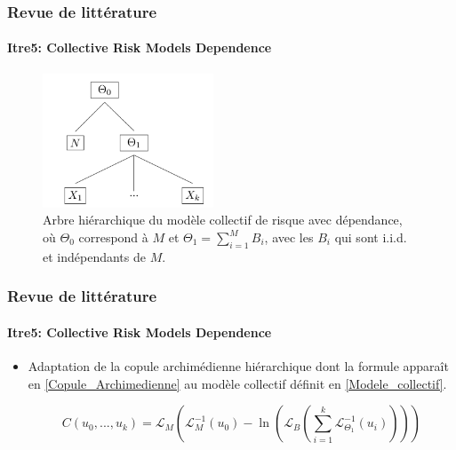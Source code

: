 \documentclass[11pt]{beamer}
\begin{document}
\begin{frame}
	\frametitle{Revue de littérature}
	\framesubtitle{Itre5: Collective Risk Models Dependence \cite{Itre5}}
	
	\begin{figure}[H]
		\centering
		\includegraphics[height=4cm]{Hierarchie}
		\renewcommand{\figurename}{Illustration}
		\caption{Arbre hiérarchique du modèle collectif de risque avec dépendance, où $\Theta_0$ correspond à $M$ et $\Theta_1 = \sum_{i=1}^{M}B_i$, avec les $B_i$ qui sont i.i.d. et indépendants de $M$.}\label{hierarchie_Modele_collectif}
	\end{figure}
	
\end{frame}


\begin{frame}
	\frametitle{Revue de littérature}
	\framesubtitle{Itre5: Collective Risk Models Dependence \cite{Itre5}}
	
	\begin{itemize}
		\item Adaptation de la copule archimédienne hiérarchique dont la formule apparaît en \eqref{Copule_Archimedienne} au modèle collectif définit en \eqref{Modele_collectif}.

		\begin{equation*}
			C(u_0, ..., u_k) = \mathcal{L}_M \left( 
				\mathcal{L}_{M}^{-1} (u_0) - \ln \left(
					\mathcal{L}_B \left(
						\sum_{i=1}^{k} \mathcal{L}_{\Theta_1}^{-1}(u_i)
							\right)\right)\right)
		\end{equation*}
	\end{itemize}
\end{frame}
\end{document}
